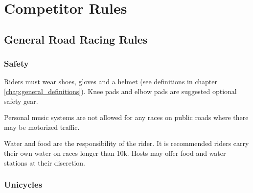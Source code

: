 \chapter{Competitor Rules}

\section{General Road Racing Rules}

\subsection{Safety}
Riders must wear shoes, gloves and a helmet (see definitions in chapter \ref{chap:general_definitions}).
Knee pads and elbow pads are suggested optional safety gear.

Personal music systems are not allowed for any races on public roads where there may be motorized traffic.

Water and food are the responsibility of the rider.
It is recommended riders carry their own water on races longer than 10k.
Hosts may offer food and water stations at their discretion.

\subsection{Unicycles}

